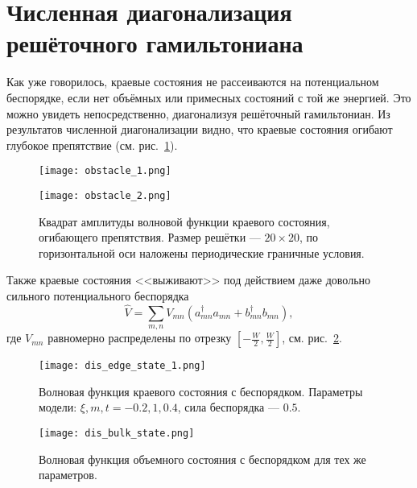 \section{Численная диагонализация решёточного гамильтониана}
Как уже говорилось, краевые состояния не рассеиваются на потенциальном беспорядке, 
если нет объёмных или примесных состояний с той же энергией. 
Это можно увидеть непосредственно, 
диагонализуя решёточный гамильтониан. Из результатов численной диагонализации видно, что
краевые состояния огибают глубокое препятствие (см. рис.~\ref{fig:obstacle}).
\begin{figure}[h]
    \centering
    \begin{minipage}[t]{0.4\linewidth}
        \texttt{[image: obstacle\_1.png]}
    \end{minipage}
    \hfill
    \begin{minipage}[t]{0.4\linewidth}
        \texttt{[image: obstacle\_2.png]}
    \end{minipage}
    \caption{
        Квадрат амплитуды волновой функции краевого состояния, огибающего препятствия. 
        Размер решётки --- $20\times20$, по горизонтальной оси наложены периодические
        граничные условия.
    }
    \label{fig:obstacle}
\end{figure}

Также краевые состояния <<выживают>> под действием даже довольно сильного потенциального
беспорядка
\begin{equation}
    \hat{V} = \sum_{m,n} V_{mn} (a_{mn}^\dagger a_{mn} + b_{mn}^\dagger b_{mn}),
\end{equation}
где $V_{mn}$ равномерно распределены по отрезку $[-\frac{W}{2}, \frac{W}{2}]$, см.
рис.~\ref{fig:disordered_stripe}.

\begin{figure}[h]
    \centering
    \begin{minipage}[h]{0.4\linewidth}
        \texttt{[image: dis\_edge\_state\_1.png]}
        \caption{
            Волновая функция краевого состояния с беспорядком.
            Параметры модели: $\xi, m, t = -0.2, 1, 0.4$, сила беспорядка --- $0.5$.
            }
    \end{minipage}
    \hfill
    \begin{minipage}[h]{0.4\linewidth}
        \texttt{[image: dis\_bulk\_state.png]}
        \caption{
            Волновая функция объемного состояния с беспорядком для тех же параметров.
            }
    \end{minipage}
    \label{fig:disordered_stripe}
\end{figure}

